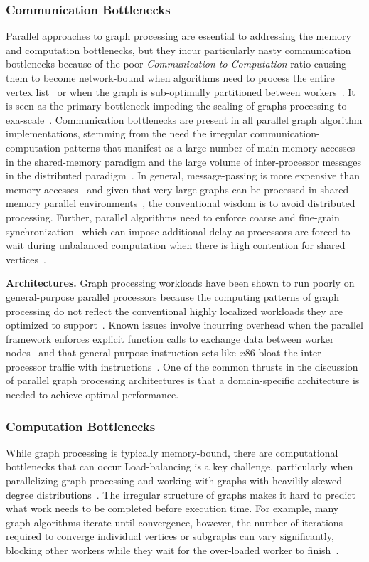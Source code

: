 \subsubsection{Communication Bottlenecks}
Parallel approaches to graph processing are essential to addressing the memory and computation bottlenecks, but they incur particularly nasty communication bottlenecks because of the poor \textit{Communication to Computation} ratio causing them to become network-bound when algorithms need to process the entire vertex list~\cite{Satish2014} or when the graph is sub-optimally partitioned between workers~\cite{Chen2019}.
It is seen as the primary bottleneck impeding the scaling of graphs processing to exa-scale~\cite{Azad2021}.
Communication bottlenecks are present in all parallel graph algorithm implementations, stemming from the need the irregular communication-computation patterns that manifest as a large number of main memory accesses in the shared-memory paradigm and the large volume of inter-processor messages in the distributed paradigm~\cite{Beamer2015}.
In general, message-passing is more expensive than memory accesses~\cite{Beamer2015} and given that very large graphs can be processed in shared-memory parallel environments~\cite{Beamer2015, Dhulipala2021}, the conventional wisdom is to avoid distributed processing. 
Further, parallel algorithms need to enforce coarse and fine-grain synchronization~\cite{Aananthakrishnan2020} which can impose additional delay as processors are forced to wait during unbalanced computation when there is high contention for shared vertices~\cite{Chen2019}.

\textbf{Architectures.}
Graph processing workloads have been shown to run poorly on general-purpose parallel processors because the computing patterns of graph processing do not reflect the conventional highly localized workloads they are optimized to support~\cite{Song2016, Kepner2016}.
Known issues involve incurring overhead when the parallel framework enforces explicit function calls to exchange data between worker nodes~\cite{Dysart2016} and that general-purpose instruction sets like $x86$ bloat the inter-processor traffic with instructions~\cite{Ham2016}. 
One of the common thrusts in the discussion of parallel graph processing architectures is that a domain-specific architecture is needed to achieve optimal performance. 


\subsubsection{Computation Bottlenecks}
While graph processing is typically memory-bound, there are computational bottlenecks that can occur 
Load-balancing is a key challenge, particularly when parallelizing graph processing and working with graphs with heavilily skewed degree distributions~\cite{Aananthakrishnan2020}.
The irregular structure of graphs makes it hard to predict what work needs to be completed before execution time.
For example, many graph algorithms iterate until convergence, however, the number of iterations required to converge individual vertices or subgraphs can vary significantly, blocking other workers while they wait for the over-loaded worker to finish~\cite{Ozdal2017}.

